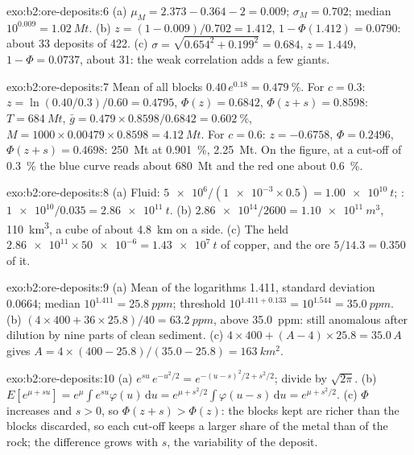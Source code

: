 \begin{solution}{exo:b2:ore-deposits:6}
(a) $\mu_M = 2.373 - 0.364 - 2 = 0.009$; $\sigma_M = 0.702$; median $10^{0.009} = \qty{1.02}{Mt}$.
(b) $z = (1 - 0.009)/0.702 = 1.412$, $1 - \Phi(1.412) = 0.0790$: about 33 deposits of 422.
(c) $\sigma = \sqrt{0.654^2 + 0.199^2} = 0.684$, $z = 1.449$, $1 - \Phi = 0.0737$, about 31: the
weak correlation adds a few giants.
\end{solution}

\begin{solution}{exo:b2:ore-deposits:7}
Mean of all blocks $0.40\,e^{0.18} = \qty{0.479}{\percent}$. For $c = 0.3$: $z = \ln(0.40/0.3)/0.60 =
0.4795$, $\Phi(z) = 0.6842$, $\Phi(z + s) = 0.8598$: $T = \qty{684}{Mt}$, $\bar g = 0.479 \times
0.8598/0.6842 = \qty{0.602}{\percent}$, $M = 1000 \times 0.00479 \times 0.8598 = \qty{4.12}{Mt}$.
For $c = 0.6$: $z = -0.6758$, $\Phi = 0.2496$, $\Phi(z + s) = 0.4698$: \qty{250}{Mt} at
\qty{0.901}{\percent}, \qty{2.25}{Mt}. On the figure, at a cut-off of \qty{0.3}{\percent} the blue
curve reads about \qty{680}{Mt} and the red one about \qty{0.6}{\percent}.
\end{solution}

\begin{solution}{exo:b2:ore-deposits:8}
(a) Fluid: $\num{5e6}/(\num{1e-3} \times 0.5) = \qty{1.00e10}{t}$; : $\num{1e10}/0.035 =
\qty{2.86e11}{t}$. (b) $\num{2.86e14}/2600 = \qty{1.10e11}{m^3}$, \qty{110}{km^3}, a cube of 
about \qty{4.8}{km} on a side. (c) The  held $\num{2.86e11}
\times \num{50e-6} = \qty{1.43e7}{t}$ of copper, and the ore $5/14.3 = 0.350$ of it.
\end{solution}

\begin{solution}{exo:b2:ore-deposits:9}
(a) Mean of the logarithms 1.411, standard deviation 0.0664; median $10^{1.411} = \qty{25.8}{ppm}$;
threshold $10^{1.411 + 0.133} = 10^{1.544} = \qty{35.0}{ppm}$. (b) $(4 \times 400 + 36 \times 25.8)/40 =
\qty{63.2}{ppm}$, above \qty{35.0}{ppm}: still anomalous after dilution by nine parts of clean
sediment. (c) $4 \times 400 + (A - 4) \times 25.8 = 35.0\,A$ gives $A = 4 \times (400 -
25.8)/(35.0 - 25.8) = \qty{163}{km^2}$.
\end{solution}

\begin{solution}{exo:b2:ore-deposits:10}
(a) $e^{su}\,e^{-u^2/2} = e^{-(u - s)^2/2 + s^2/2}$; divide by $\sqrt{2\pi}$. (b) $E[e^{\mu + su}] =
e^{\mu}\int e^{su}\varphi(u)\,\mathrm{d}u = e^{\mu + s^2/2}\int\varphi(u - s)\,\mathrm{d}u = e^{\mu +
s^2/2}$. (c) $\Phi$ increases and $s > 0$, so $\Phi(z + s) > \Phi(z)$: the blocks kept are richer than
the blocks discarded, so each cut-off keeps a larger share of the metal than of the rock; the
difference grows with $s$, the variability of the deposit.
\end{solution}

